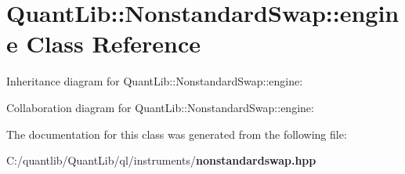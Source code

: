 \section{Quant\+Lib\+:\+:Nonstandard\+Swap\+:\+:engine Class Reference}
\label{class_quant_lib_1_1_nonstandard_swap_1_1engine}


Inheritance diagram for Quant\+Lib\+:\+:Nonstandard\+Swap\+:\+:engine\+:


Collaboration diagram for Quant\+Lib\+:\+:Nonstandard\+Swap\+:\+:engine\+:


The documentation for this class was generated from the following file\+:\begin{DoxyCompactItemize}
\item 
C\+:/quantlib/\+Quant\+Lib/ql/instruments/{\bf nonstandardswap.\+hpp}\end{DoxyCompactItemize}
